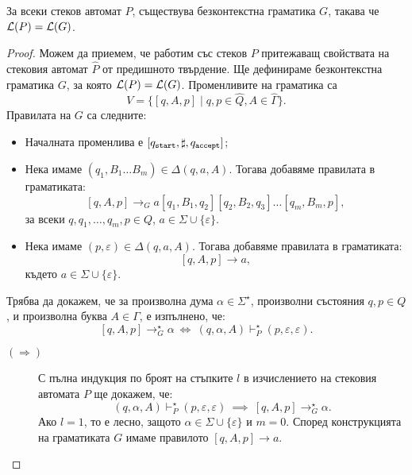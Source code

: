 \begin{framed}
  \begin{lemma}
    За всеки стеков автомат $P$, съществува безконтекстна граматика $G$, такава че $\mathcal{L}(P) = \mathcal{L}(G)$.
  \end{lemma}
\end{framed}
\begin{proof}
  Можем да приемем, че работим със стеков $P$ притежаващ свойствата на стековия автомат $\hat{P}$ от предишното твърдение.
  Ще дефинираме безконтекстна граматика $G$, за която $\mathcal{L}(P) = \mathcal{L}(G)$.
  Променливите на граматика са 
  \[V = \{[q,A,p] \mid q,p \in \hat{Q}, A \in \hat{\Gamma}\}.\]
  Правилата на $G$ са следните:
  \begin{itemize}
  \item
    Началната променлива е $[q_{\texttt{start}},\sharp,q_{\texttt{accept}}]$;
  \item
    Нека имаме $(q_1,B_1\dots B_m) \in \Delta(q, a, A)$.
    Тогава добавяме правилата в граматиката:
    \[[q,A,p] \to_G a[q_1,B_1,q_2][q_2,B_2,q_3]\dots [q_m,B_m,p],\]
    за всеки $q,q_1,\dots,q_{m},p \in Q$, $a \in \Sigma \cup \{\varepsilon\}$.
  \item
    Нека имаме $(p,\varepsilon) \in \Delta(q,a,A)$.
    Тогава добавяме правилата в граматиката:
    \[[q,A,p] \to a,\]
    където $a \in \Sigma \cup \{\varepsilon\}$.
  \end{itemize}
  Трябва да докажем, че за произволна дума $\alpha \in \Sigma^\star$, произволни състояния $q,p \in Q$,
  и произволна буква $A \in \Gamma$, е изпълнено, че:
  \[[q,A,p] \rightarrow^\star_G \alpha\ \Leftrightarrow\ (q,\alpha,A) \vdash^\star_{P} (p,\varepsilon,\varepsilon).\]
  \begin{description}
  \item[$(\Rightarrow)$]
    С пълна индукция по броят на стъпките $l$ в изчислението на стековия автомата $P$ ще докажем, че:
    \[(q,\alpha,A) \vdash^\star_P (p,\varepsilon,\varepsilon)\ \implies\ [q,A,p] \to^\star_G \alpha.\]
    Ако $l = 1$, то е лесно, защото $\alpha \in \Sigma \cup\{\varepsilon\}$ и $m = 0$.
    Според конструкцията на граматиката $G$ имаме правилото $[q,A,p] \to a$.
    

\end{description}
\end{proof}
